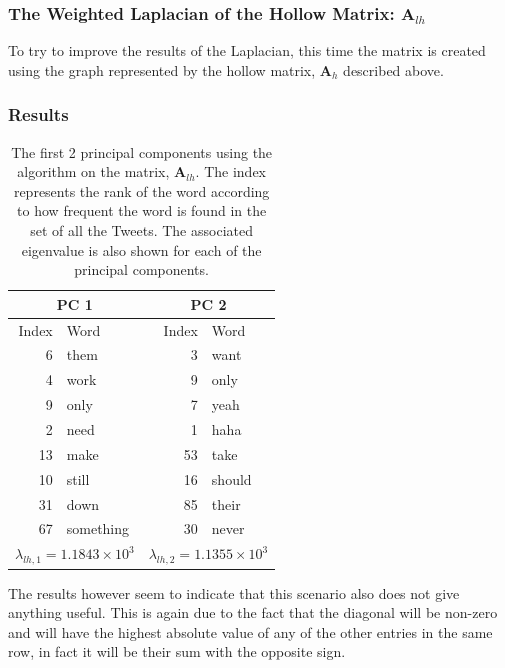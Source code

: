 \documentclass[11pt,a4paper]{article}
\newcommand{\covmat}{\mathbf{A}}
\begin{document}
\subsubsection{The Weighted Laplacian of the Hollow Matrix: $\mathbf{A}_{lh}$}

To try to improve the results of the Laplacian, this time the matrix is created using the graph represented by the hollow matrix, $\covmat_h$ described above.

\subsubsection*{Results}
\begin{table}[H]
\center
\begin{tabular}{| r| l | r| l |}
\hline
\multicolumn{2}{|c|}{PC 1} & \multicolumn{2}{|c|}{PC 2}\\
\hline
Index & Word & Index & Word\\
\hline
6 & them & 3 & want\\
4 & work & 9 & only\\
9 & only & 7 & yeah\\
2 & need & 1 & haha\\
13 & make & 53 & take\\
10 & still & 16 & should\\
31 & down & 85 & their\\
67 & something & 30 & never\\
\hline
\multicolumn{2}{|c|}{ $\lambda_{lh,1} =1.1843\times 10^3$}  &
\multicolumn{2}{|c|}{ $\lambda_{lh, 2} = 1.1355 \times 10^3$}  \\
\hline
\end{tabular}
\caption{The first 2 principal components using the algorithm on the matrix, $ \mathbf{A}_{lh}$. The index represents the rank of the word according to how frequent the word is found in the set of all the Tweets. The associated eigenvalue is also shown for each of the principal components.}
\end{table}

The results however seem to indicate that this scenario also does not give anything useful. This is again due to the fact that the diagonal will be non-zero and will have the highest absolute value of any of the other entries in the same row, in fact it will be their sum with the opposite sign.  
\end{document}
